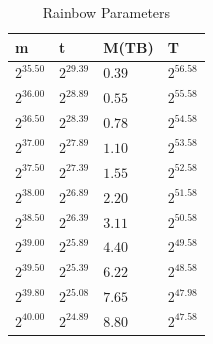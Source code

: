 \begin{table}[H]
  \centering
  \begin{tabular}{llll}
    m & t & M(TB) & T \\ \hline
    $2^{35.50}$ & $2^{29.39}$ & $0.39$ & $2^{56.58}$ \\
    $2^{36.00}$ & $2^{28.89}$ & $0.55$ & $2^{55.58}$ \\
    $2^{36.50}$ & $2^{28.39}$ & $0.78$ & $2^{54.58}$ \\
    $2^{37.00}$ & $2^{27.89}$ & $1.10$ & $2^{53.58}$ \\
    $2^{37.50}$ & $2^{27.39}$ & $1.55$ & $2^{52.58}$ \\
    $2^{38.00}$ & $2^{26.89}$ & $2.20$ & $2^{51.58}$ \\
    $2^{38.50}$ & $2^{26.39}$ & $3.11$ & $2^{50.58}$ \\
    $2^{39.00}$ & $2^{25.89}$ & $4.40$ & $2^{49.58}$ \\
    $2^{39.50}$ & $2^{25.39}$ & $6.22$ & $2^{48.58}$ \\
    $2^{39.80}$ & $2^{25.08}$ & $7.65$ & $2^{47.98}$ \\
    $2^{40.00}$ & $2^{24.89}$ & $8.80$ & $2^{47.58}$ \\
  \end{tabular}
  \caption{Rainbow Parameters}
  \label{tab:rainparam}
\end{table}
